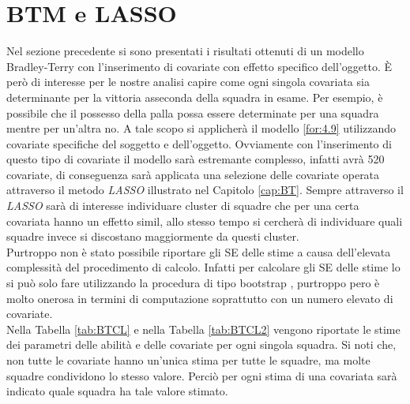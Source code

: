 \section{BTM e LASSO}
Nel sezione precedente si sono presentati i risultati ottenuti di un modello Bradley-Terry con l'inserimento di covariate con effetto specifico dell'oggetto. È però di interesse per le nostre analisi capire come ogni singola covariata sia determinante per la vittoria asseconda della squadra in esame. Per esempio, è possibile che il possesso della palla possa essere determinate per una squadra mentre per un'altra no. A tale scopo si applicherà il modello \ref{for:4.9} utilizzando covariate specifiche del soggetto e dell'oggetto. Ovviamente con l'inserimento di questo tipo di covariate il modello sarà estremante complesso, infatti avrà 520 covariate, di conseguenza sarà applicata una selezione delle covariate operata attraverso il metodo \emph{LASSO} illustrato nel Capitolo \ref{cap:BT}. Sempre attraverso il \emph{LASSO} sarà di interesse individuare cluster di squadre che per una certa covariata hanno un effetto simil, allo stesso tempo si cercherà di individuare quali squadre invece si discostano maggiormente da questi cluster.\\
Purtroppo non è stato possibile riportare gli SE delle stime a causa dell'elevata complessità del procedimento di calcolo. Infatti per calcolare gli SE delle stime lo si può solo fare utilizzando la procedura di tipo bootstrap \autocite{henderson2005bootstrap}, purtroppo pero è molto onerosa in termini di computazione soprattutto con un numero elevato di covariate.\\
Nella Tabella \ref{tab:BTCL} e nella Tabella \ref{tab:BTCL2} vengono riportate le stime dei parametri delle abilità e delle covariate per ogni singola squadra. Si noti che, non tutte le covariate hanno un’unica stima per tutte le squadre, ma molte squadre condividono lo stesso valore. Perciò per ogni stima di una covariata sarà indicato quale squadra ha tale valore stimato.

